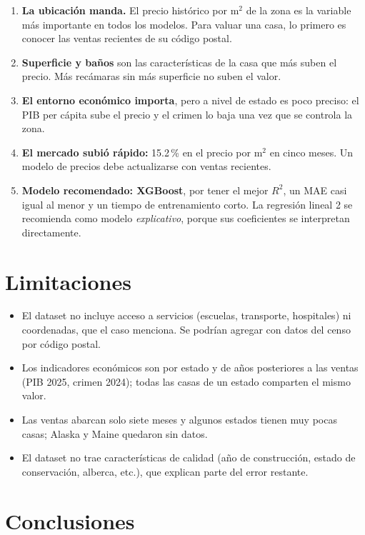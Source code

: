 \documentclass[12pt,letterpaper]{article}
\begin{document}
\begin{enumerate}[nosep]
  \item \textbf{La ubicación manda.} El precio histórico por m$^2$ de la zona es la variable más importante en todos los modelos. Para valuar una casa, lo primero es conocer las ventas recientes de su código postal.
  \item \textbf{Superficie y baños} son las características de la casa que más suben el precio. Más recámaras sin más superficie no suben el valor.
  \item \textbf{El entorno económico importa}, pero a nivel de estado es poco preciso: el PIB per cápita sube el precio y el crimen lo baja una vez que se controla la zona.
  \item \textbf{El mercado subió rápido:} 15.2\,\% en el precio por m$^2$ en cinco meses. Un modelo de precios debe actualizarse con ventas recientes.
  \item \textbf{Modelo recomendado: XGBoost}, por tener el mejor $R^2$, un MAE casi igual al menor y un tiempo de entrenamiento corto. La regresión lineal 2 se recomienda como modelo \emph{explicativo}, porque sus coeficientes se interpretan directamente.
\end{enumerate}

\section{Limitaciones}\label{sec:limitaciones}

\begin{itemize}[nosep]
  \item El dataset no incluye acceso a servicios (escuelas, transporte, hospitales) ni coordenadas, que el caso menciona. Se podrían agregar con datos del censo por código postal.
  \item Los indicadores económicos son por estado y de años posteriores a las ventas (PIB 2025, crimen 2024); todas las casas de un estado comparten el mismo valor.
  \item Las ventas abarcan solo siete meses y algunos estados tienen muy pocas casas; Alaska y Maine quedaron sin datos.
  \item El dataset no trae características de calidad (año de construcción, estado de conservación, alberca, etc.), que explican parte del error restante.
\end{itemize}

\section{Conclusiones}
\end{document}

